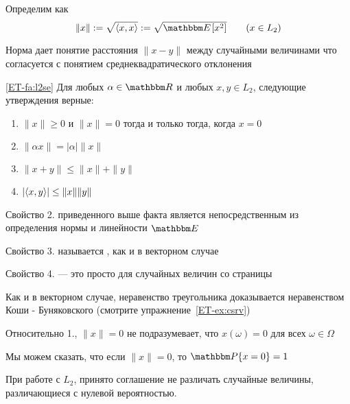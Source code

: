 \begin{frame}

    \vspace{2em}
    Определим  как
    \begin{equation*}
        \label{eq:rvnorm}
        \| x \| 
        := \sqrt{ \inner{x, x} } 
        := \sqrt{ \EE[x^2] } 
        \qquad (x \in L_2)
    \end{equation*}
    
    Норма дает понятие расстояния $\|x - y\|$ между случайными
    величинами что согласуется с понятием среднеквадратического отклонения
    
    \vspace{1em}
    \Fact\eqref{ET-fa:l2se}
    Для любых $\alpha \in \RR$ и любых $x, y \in L_2$, следующие утверждения верные:
    \begin{enumerate}
        \item $\| x \| \geq 0$ и $\| x \| = 0$ тогда и только тогда, когда
            $x = 0$
        \item $\| \alpha x \| = |\alpha| \| x \|$
        \item $\| x + y \| \leq  \| x \| + \| y \|$
        \item $| \! \left\langle{x, y}\right\rangle\!  | \leq  \| x \| \| y \|$
    \end{enumerate}
    
\end{frame}

\begin{frame}

    \vspace{2em}
    Свойство 2. приведенного выше факта является непосредственным из определения нормы и линейности $\EE$
    
    Свойство 3.
    называется , как и в векторном случае
    
    Свойство 4. --- это просто  для случайных величин со 
    страницы~\pageref{ET-fa:csrv}
    
    Как и в векторном случае, неравенство треугольника доказывается неравенством Коши - Буняковского (смотрите упражнение~\ref{ET-ex:csrv})
    
\end{frame}

\begin{frame}

    \vspace{2em}
    Относительно 1., $\| x \| = 0$ не подразумевает, что $x(\omega) = 0$ для всех $\omega \in \Omega$
    
   Мы можем сказать, что если $\| x \| = 0$, то $\PP\{x =0\} =1$
    
    \vspace{1em}
    При работе с $L_2$, принято соглашение не различать случайные величины, различающиеся с нулевой вероятностью.
    
\end{frame}

